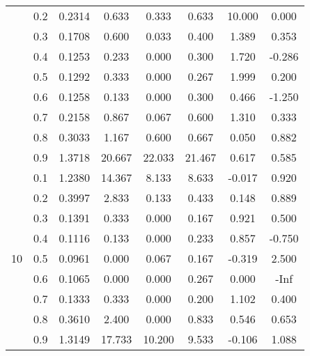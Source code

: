 \documentclass[11pt,a4paper]{report}
\begin{document}
\begin{longtable}{ | c | c || c | c | c | c | c | c | }
 & 0.2 & 0.2314 & 0.633 & 0.333 & 0.633 & 10.000 & 0.000 \\
 & 0.3 & 0.1708 & 0.600 & 0.033 & 0.400 & 1.389 & 0.353 \\
 & 0.4 & 0.1253 & 0.233 & 0.000 & 0.300 & 1.720 & -0.286 \\
 & 0.5 & 0.1292 & 0.333 & 0.000 & 0.267 & 1.999 & 0.200 \\
 & 0.6 & 0.1258 & 0.133 & 0.000 & 0.300 & 0.466 & -1.250 \\
 & 0.7 & 0.2158 & 0.867 & 0.067 & 0.600 & 1.310 & 0.333 \\
 & 0.8 & 0.3033 & 1.167 & 0.600 & 0.667 & 0.050 & 0.882 \\
 & 0.9 & 1.3718 & 20.667 & 22.033 & 21.467 & 0.617 & 0.585 \\
 \hline
\multirow{9}{*}{10} & 0.1 & 1.2380 & 14.367 & 8.133 & 8.633 & -0.017 & 0.920 \\
 & 0.2 & 0.3997 & 2.833 & 0.133 & 0.433 & 0.148 & 0.889 \\
 & 0.3 & 0.1391 & 0.333 & 0.000 & 0.167 & 0.921 & 0.500 \\
 & 0.4 & 0.1116 & 0.133 & 0.000 & 0.233 & 0.857 & -0.750 \\
 & 0.5 & 0.0961 & 0.000 & 0.067 & 0.167 & -0.319 & 2.500 \\
 & 0.6 & 0.1065 & 0.000 & 0.000 & 0.267 & 0.000 & -Inf \\
 & 0.7 & 0.1333 & 0.333 & 0.000 & 0.200 & 1.102 & 0.400 \\
 & 0.8 & 0.3610 & 2.400 & 0.000 & 0.833 & 0.546 & 0.653 \\
 & 0.9 & 1.3149 & 17.733 & 10.200 & 9.533 & -0.106 & 1.088 \\
 \hline
\hline
\end{longtable}
\end{document}
